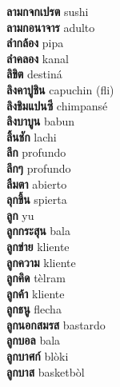 \textbf{ ลามกจกเปรต  } sushi \\
\textbf{ ลามกอนาจาร  } adulto \\
\textbf{ ลำกล้อง  } pipa \\
\textbf{ ลำคลอง  } kanal \\
\textbf{ ลิขิต  } destiná \\
\textbf{ ลิงคาปูชิน  } capuchin (fli) \\
\textbf{ ลิงชิมแปนซี  } chimpansé \\
\textbf{ ลิงบาบูน  } babun \\
\textbf{ ลิ้นชัก  } lachi \\
\textbf{ ลึก  } profundo \\
\textbf{ ลึกๆ  } profundo \\
\textbf{ ลืมตา  } abierto \\
\textbf{ ลุกขึ้น  } spierta \\
\textbf{ ลูก  } yu \\
\textbf{ ลูกกระสุน  } bala \\
\textbf{ ลูกข่าย  } kliente \\
\textbf{ ลูกความ  } kliente \\
\textbf{ ลูกคิด  } tèlram \\
\textbf{ ลูกค้า  } kliente \\
\textbf{ ลูกธนู  } flecha \\
\textbf{ ลูกนอกสมรส  } bastardo \\
\textbf{ ลูกบอล  } bala \\
\textbf{ ลูกบาศก์  } blòki \\
\textbf{ ลูกบาส  } basketbòl \\
